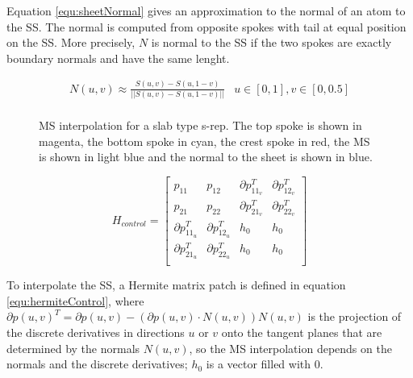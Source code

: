 Equation \ref{equ:sheetNormal} gives an approximation to the normal of an atom to the SS. 
The normal is computed from opposite spokes with tail at equal position on the SS. 
More precisely, $N$ is normal to the SS if the two spokes are exactly boundary normals 
and have the same lenght. 

\begin{equation}
  \begin{array}{cc}
   N(u, v) \approx \frac{S(u, v) - S(u, 1 - v)}{||S(u, v) - S(u, 1 - v)||}  & u  \in [0, 1], v \in [0, 0.5] \\
  \end{array}
\label{equ:sheetNormal}
\end{equation}

\begin{figure} 
 \centering  
 \caption[Slab's MS interpolation.]{MS interpolation for a slab type s-rep. The top spoke is shown in magenta, the bottom spoke in cyan, the crest spoke in red,
          the MS is shown in light blue and the normal to the sheet is shown in blue.}
 \label{fig:interpolationMedialSheet}  
\end{figure}

\begin{equation}
 H_{control} = \left [ \begin{array}{cccc}
                    p_{11} & p_{12} 			& \partial p_{{11}_v}^T & \partial p_{{12}_v}^T \\
                    p_{21} & p_{22}			& \partial p_{{21}_v}^T & \partial p_{{22}_v}^T \\
                    \partial p_{{11}_u}^T & \partial p_{{12}_u}^T	& h_{0} & h_{0} \\
                    \partial p_{{21}_u}^T & \partial p_{{22}_u}^T	& h_{0} & h_{0} \\
                    
                   \end{array} \right ]
  \label{equ:hermiteControl}
\end{equation}

To interpolate the SS, a Hermite matrix patch is defined in equation \ref{equ:hermiteControl},
where $\partial p(u,v)^T = \partial p(u,v) - (\partial p(u,v) \cdot N(u, v))N(u,v)$ is the projection of the discrete derivatives in directions $u$ or $v$ onto the tangent planes
that are determined by the normals $N(u,v)$, so the MS interpolation depends on the normals and the discrete derivatives; $h_{0}$ is a vector filled with $0$. 

